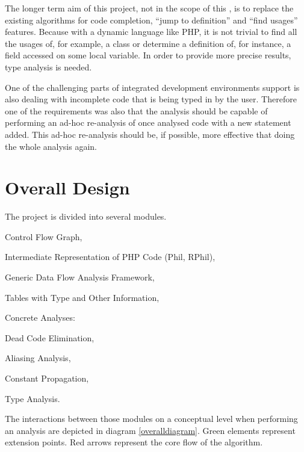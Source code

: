     The longer term aim of this project, not in the scope 
    of this \wthesis{}, is to replace the existing 
    algorithms for code completion, ``jump to definition'' 
    and ``find usages'' features. Because 
    with a dynamic language like PHP, it is not trivial to 
    find all the usages of, for example, a class or determine 
    a definition of, for instance, a field accessed 
    on some local variable. In order to provide more 
    precise results, type analysis is needed.
    
    One of the challenging parts of integrated development 
    environments support is also dealing with incomplete code 
    that is being typed in by the user. Therefore one of 
    the requirements was also that the analysis should 
    be capable of performing an ad-hoc re-analysis of 
    once analysed code with a new statement added. 
    This ad-hoc re-analysis should be, if possible, 
    more effective that doing the whole analysis again.
    
    \section{Overall Design}
    
    The project is divided into several modules.
    \begin{itemize*}
        \item Control Flow Graph,
        \item Intermediate Representation of PHP Code (Phil, RPhil),
        \item Generic Data Flow Analysis Framework, 
        \item Tables with Type and Other Information, 
        \item Concrete Analyses:
        \begin{itemize*}
            \item Dead Code Elimination, 
            \item Aliasing Analysis, 
            \item Constant Propagation,
            \item Type Analysis.
        \end{itemize*}
    \end{itemize*}
    
    The interactions between those modules on a conceptual level 
    when performing an analysis are depicted in diagram \ref{overalldiagram}. 
    Green elements represent extension points. Red arrows represent the 
    core flow of the algorithm.

